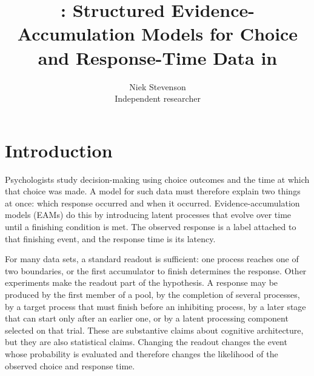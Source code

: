 \documentclass[article]{jss}
\author{Niek Stevenson\\Independent researcher}
\title{\pkgname: Structured Evidence-Accumulation Models for Choice and Response-Time Data in \proglang{R}}
\begin{document}
\section{Introduction}
\label{sec:introduction}

Psychologists study decision-making using choice outcomes and the time at which
that choice was made. A model for such data must therefore explain
two things at once: which response occurred and when it occurred.
Evidence-accumulation models (EAMs) do this by introducing latent processes that evolve
over time until a finishing condition is met. The observed response is a label
attached to that finishing event, and the response time is its latency. 


For many data sets, a standard readout is sufficient: one process reaches one
of two boundaries, or the first accumulator to finish determines the response.
Other experiments make the readout part of the hypothesis. A response may be
produced by the first member of a pool, by the completion of several processes,
by a target process that must finish before an inhibiting process, by a later
stage that can start only after an earlier one, or by a latent processing
component selected on that trial. These are substantive claims about cognitive
architecture, but they are also statistical claims. Changing the readout changes
the event whose probability is evaluated and therefore changes the likelihood of
the observed choice and response time.
\end{document}
